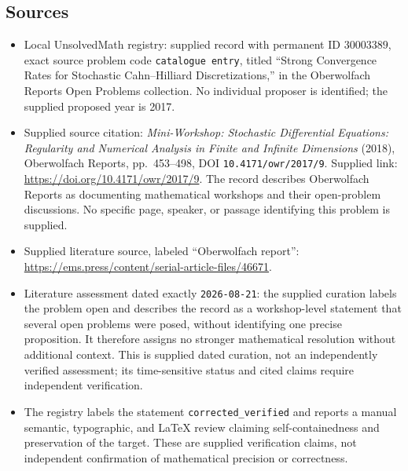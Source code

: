 \documentclass[11pt]{article}
\begin{document}
\subsection{Sources}
\begin{itemize}
\item Local UnsolvedMath registry: supplied record with permanent ID \(30003389\), exact source problem code \texttt{catalogue entry}, titled ``Strong Convergence Rates for Stochastic Cahn--Hilliard Discretizations,'' in the Oberwolfach Reports Open Problems collection. No individual proposer is identified; the supplied proposed year is 2017.
\item Supplied source citation: \emph{Mini-Workshop: Stochastic Differential Equations: Regularity and Numerical Analysis in Finite and Infinite Dimensions} (2018), Oberwolfach Reports, pp.\ 453--498, DOI \texttt{10.4171/owr/2017/9}. Supplied link: \url{https://doi.org/10.4171/owr/2017/9}. The record describes Oberwolfach Reports as documenting mathematical workshops and their open-problem discussions. No specific page, speaker, or passage identifying this problem is supplied.
\item Supplied literature source, labeled ``Oberwolfach report'': \url{https://ems.press/content/serial-article-files/46671}.
\item Literature assessment dated exactly \texttt{2026-08-21}: the supplied curation labels the problem open and describes the record as a workshop-level statement that several open problems were posed, without identifying one precise proposition. It therefore assigns no stronger mathematical resolution without additional context. This is supplied dated curation, not an independently verified assessment; its time-sensitive status and cited claims require independent verification.
\item The registry labels the statement \texttt{corrected\_verified} and reports a manual semantic, typographic, and LaTeX review claiming self-containedness and preservation of the target. These are supplied verification claims, not independent confirmation of mathematical precision or correctness.
\end{itemize}
\end{document}
